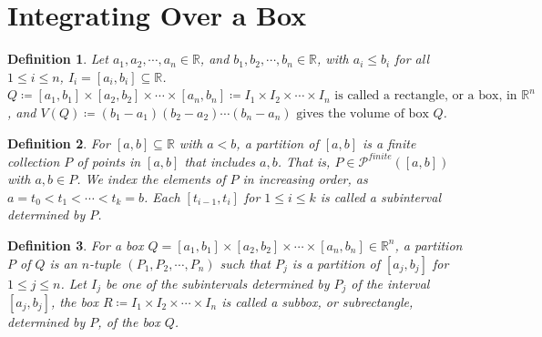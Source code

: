\documentclass[11pt,oneside]{book}
\theoremstyle{break}
\theoremstyle{break}
\newtheorem{defn}{Definition}[corL]
\newcommand{\R}{\mathbb{R}}
\newcommand{\Power}{\mathcal{P}}
\begin{document}
\section[Integrating Over a Box]{\color{red} Integrating Over a Box \color{black}}
\begin{defn}
Let $a_1,a_2,\cdots, a_n \in \R$, and $b_1,b_2,\cdots,b_n \in \R$, with $a_i \leq b_i$ for all $1 \leq i \leq n$, $I_i = [a_i, b_i]\subseteq \R$. $Q \coloneqq [a_1,b_1] \times [a_2,b_2] \times \cdots \times [a_n,b_n] \coloneqq I_1\times I_2 \times \cdots \times I_n \text{ is called a rectangle, or a box, in } \R^n$, and $V(Q) \coloneqq (b_1-a_1)(b_2-a_2) \cdots (b_n-a_n) \text{ gives the volume of box }Q$.
\end{defn}
\begin{defn}
For $[a,b]\subseteq \R$ with $a<b$, a partition of $[a,b]$ is a finite collection $P$ of points in $[a,b]$ that includes $a,b$. That is, $P \in \Power^{finite} ([a,b])$ with $a,b\in P$. We index the elements of $P$ in increasing order, as $a =t_0 < t_1 < \cdots < t_k = b$. Each $[t_{i-1},t_i]$ for $1\leq i \leq k$ is called a subinterval determined by $P$.
\end{defn}
\begin{defn}
For a box $Q = [a_1,b_1] \times [a_2,b_2] \times \cdots \times [a_n,b_n] \in \R^n$, a partition $P$ of $Q$ is an $n$-tuple $(P_1,P_2,\cdots,P_n)$ such that $P_j$ is a partition of $[a_j,b_j]$ for $1 \leq j \leq n$. Let $I_j$ be one of the subintervals determined by $P_j$ of the interval $[a_j,b_j]$, the box $R\coloneqq I_1 \times I_2 \times \cdots \times I_n$ is called a subbox, or subrectangle, determined by $P$, of the box $Q$. 
\end{defn}
\end{document}
